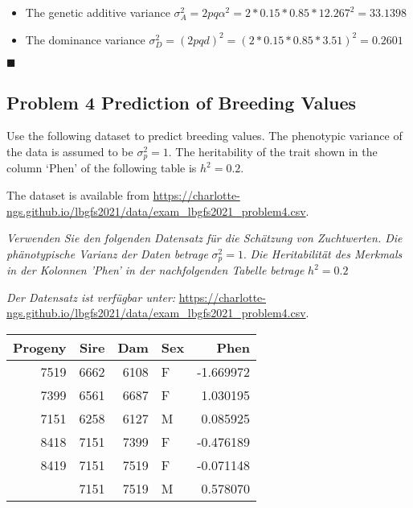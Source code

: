 \documentclass[
]{article}
\providecommand{\tightlist}{%
  \setlength{\itemsep}{0pt}\setlength{\parskip}{0pt}}
\newcommand{\solend}
{\vspace{2ex}$\blacksquare$}
\begin{document}
\begin{itemize}
\tightlist
\item
  The genetic additive variance
  \(\sigma_A^2 = 2pq\alpha^2 = 2 * 0.15 * 0.85 * 12.267^2 = 33.1398\)
\item
  The dominance variance
  \(\sigma_D^2 = \left(2pqd \right)^2 = (2* 0.15 * 0.85 * 3.51) ^2 = 0.2601\)
\end{itemize}

\solend

\clearpage
\pagebreak

\hypertarget{problem-4-prediction-of-breeding-values}{%
\subsection{Problem 4 Prediction of Breeding
Values}\label{problem-4-prediction-of-breeding-values}}

Use the following dataset to predict breeding values. The phenotypic
variance of the data is assumed to be \(\sigma_p^2 = 1\). The
heritability of the trait shown in the column `Phen' of the following
table is \(h^2 = 0.2\).

The dataset is available from
\url{https://charlotte-ngs.github.io/lbgfs2021/data/exam_lbgfs2021_problem4.csv}.

\textit{Verwenden Sie den folgenden Datensatz für die Schätzung von Zuchtwerten. Die phänotypische Varianz der Daten betrage}
\(\sigma_p^2 = 1\).
\textit{Die Heritabilität des Merkmals in der Kolonnen 'Phen' in der nachfolgenden Tabelle betrage}
\(h^2 = 0.2\)

\textit{Der Datensatz ist verfügbar unter: }
\url{https://charlotte-ngs.github.io/lbgfs2021/data/exam_lbgfs2021_problem4.csv}.

\vspace{3ex}

\begin{tabular}{rrrlr}
\toprule
Progeny & Sire & Dam & Sex & Phen\\
\midrule
7519 & 6662 & 6108 & F & -1.669972\\
7399 & 6561 & 6687 & F & 1.030195\\
7151 & 6258 & 6127 & M & 0.085925\\
8418 & 7151 & 7399 & F & -0.476189\\
8419 & 7151 & 7519 & F & -0.071148\\
\addlinespace
8420 & 7151 & 7519 & M & 0.578070\\
\bottomrule
\end{tabular}
\end{document}
